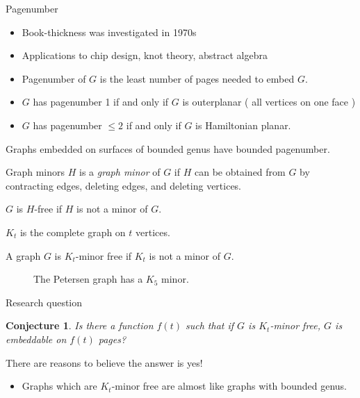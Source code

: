 \documentclass[]{beamer}
\newtheorem{conjecture}[theorem]{Conjecture}
\begin{document}
\begin{frame}{Pagenumber}
	\begin{itemize}
		\item Book-thickness was investigated in 1970s
		\item Applications to chip design, knot theory, abstract algebra
	\end{itemize}
	\begin{itemize}
		\item Pagenumber of $G$ is the least number of pages needed to embed $G$.
		\item $G$ has pagenumber 1 if and only if $G$ is outerplanar ( all vertices on one face )
		\item $G$ has pagenumber $\leq 2$ if and only if $G$ is Hamiltonian planar.
	\end{itemize}
	
	\begin{theorem}
		Graphs embedded on surfaces of bounded genus have bounded pagenumber.
	\end{theorem}
\end{frame}

\begin{frame}{Graph minors}
	$H$ is a \textit{graph minor} of $G$ if $H$ can be obtained from $G$ by contracting edges, deleting edges, and deleting vertices.
	
	$G$ is $H$-free if $H$ is not a minor of $G$. 
\end{frame}

\begin{frame}
	$K_t$ is the complete graph on $t$ vertices.
	\begin{definition}
		A graph $G$ is $K_t$-minor free if $K_t$ is not a minor of $G$.
	\end{definition}
	\begin{figure}[h]
		\centering
		
		
		\caption{The Petersen graph has a $K_5$ minor.}\label{P10contraction}
	\end{figure}
\end{frame}

\begin{frame}{Research question}
	\begin{conjecture}
		Is there a function $f(t)$ such that if $G$ is $K_t$-minor free, $G$ is embeddable on $f(t)$ pages?
	\end{conjecture}
	There are reasons to believe the answer is yes!
	\begin{itemize}
		\item Graphs which are $K_t$-minor free are almost like graphs with bounded genus.
	\end{itemize}
\end{frame}
\end{document}
